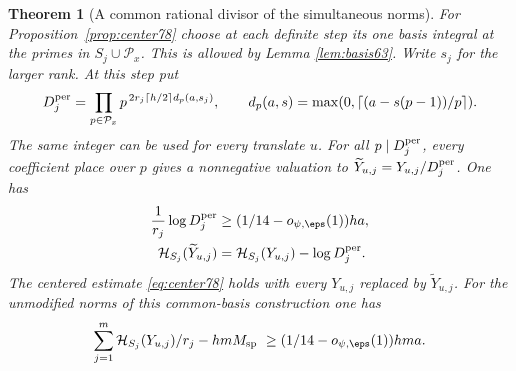 \documentclass[a4paper,11pt]{article}
\newtheorem{theorem}[proposition]{Theorem}
\theoremstyle{definition}
\theoremstyle{remark}
\numberwithin{equation}{section}
\begin{document}
\begin{theorem}[A common rational divisor of the simultaneous norms]
\leavevmode\label{thm:quot80}
For Proposition~\ref{prop:center78} choose at each definite
step its one basis integral at the primes in \(S_j\cup\mathcal P_x\).
This is allowed by Lemma \ref{lem:basis63}. Write \(s_j\) for
the larger rank. At this step put
\[
    D_j^{\rm per}=\prod_{p\in\mathcal P_x}
        p^{\,2r_j\lceil h/2\rceil d_p(a,s_j)},\qquad
    d_p(a,s)=\max(0,\lceil (a-s(p-1))/p\rceil).
\]
The same integer can be used for every translate \(u\).
For all \(p\mid D_j^{\rm per}\), every coefficient place over
\(p\) gives a nonnegative valuation to
\(\widetilde Y_{u,j}=Y_{u,j}/D_j^{\rm per}\). One has
\begin{align}
 \frac{1}{r_j}\log D_j^{\rm per}
    &\ge (1/14-o_{\psi,\eps}(1))ha,                         \label{eq:div80}\\
 \mathcal H_{S_j}(\widetilde Y_{u,j})
    &=\mathcal H_{S_j}(Y_{u,j})-\log D_j^{\rm per}.           \label{eq:htdiv80}
\end{align}
The centered estimate \eqref{eq:center78} holds with every
\(Y_{u,j}\) replaced by \(\widetilde Y_{u,j}\).
For the unmodified norms of this common-basis construction one has
\[
       \sum_{j=1}^m \mathcal H_{S_j}(Y_{u,j})/r_j-hm M_{\rm sp}
             \ \ge (1/14-o_{\psi,\eps}(1))hma .
\]
\end{theorem}
\end{document}

